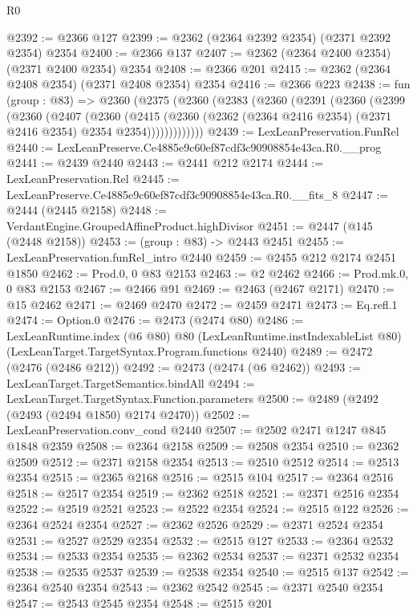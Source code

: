 \begin{lexlean}{R0}
\begin{coremodule}
@2392 := @2366 @127
@2399 := @2362 (@2364 @2392 @2354) (@2371 @2392 @2354) @2354
@2400 := @2366 @137
@2407 := @2362 (@2364 @2400 @2354) (@2371 @2400 @2354) @2354
@2408 := @2366 @201
@2415 := @2362 (@2364 @2408 @2354) (@2371 @2408 @2354) @2354
@2416 := @2366 @223
@2438 := fun (group : @83) =>
  @2360
    (@2375
      (@2360
        (@2383
          (@2360
            (@2391
              (@2360
                (@2399
                  (@2360
                    (@2407
                      (@2360
                        (@2415
                          (@2360
                            (@2362 (@2364 @2416 @2354) (@2371 @2416 @2354) @2354 @2354)))))))))))))
@2439 := LexLeanPreservation.FunRel
@2440 := LexLeanPreserve.Ce4885e9c60ef87cdf3c90908854e43ca.R0.__prog
@2441 := @2439 @2440
@2443 := @2441 @212 @2174
@2444 := LexLeanPreservation.Rel
@2445 := LexLeanPreserve.Ce4885e9c60ef87cdf3c90908854e43ca.R0.__fits_8
@2447 := @2444 (@2445 @2158)
@2448 := VerdantEngine.GroupedAffineProduct.highDivisor
@2451 := @2447 (@145 (@2448 @2158))
@2453 := (group : @83) -> @2443 @2451
@2455 := LexLeanPreservation.funRel_intro @2440
@2459 := @2455 @212 @2174 @2451 @1850
@2462 := Prod.{0, 0} @83 @2153
@2463 := @2 @2462
@2466 := Prod.mk.{0, 0} @83 @2153
@2467 := @2466 @91
@2469 := @2463 (@2467 @2171)
@2470 := @15 @2462
@2471 := @2469 @2470
@2472 := @2459 @2471
@2473 := Eq.refl.{1}
@2474 := Option.{0}
@2476 := @2473 (@2474 @80)
@2486 := LexLeanRuntime.index
    (@6 @80)
    @80
    (LexLeanRuntime.instIndexableList @80)
    (LexLeanTarget.TargetSyntax.Program.functions @2440)
@2489 := @2472 (@2476 (@2486 @212))
@2492 := @2473 (@2474 (@6 @2462))
@2493 := LexLeanTarget.TargetSemantics.bindAll
@2494 := LexLeanTarget.TargetSyntax.Function.parameters
@2500 := @2489 (@2492 (@2493 (@2494 @1850) @2174 @2470))
@2502 := LexLeanPreservation.conv_cond @2440
@2507 := @2502 @2471 @1247 @845 @1848 @2359
@2508 := @2364 @2158
@2509 := @2508 @2354
@2510 := @2362 @2509
@2512 := @2371 @2158 @2354
@2513 := @2510 @2512
@2514 := @2513 @2354
@2515 := @2365 @2168
@2516 := @2515 @104
@2517 := @2364 @2516
@2518 := @2517 @2354
@2519 := @2362 @2518
@2521 := @2371 @2516 @2354
@2522 := @2519 @2521
@2523 := @2522 @2354
@2524 := @2515 @122
@2526 := @2364 @2524 @2354
@2527 := @2362 @2526
@2529 := @2371 @2524 @2354
@2531 := @2527 @2529 @2354
@2532 := @2515 @127
@2533 := @2364 @2532
@2534 := @2533 @2354
@2535 := @2362 @2534
@2537 := @2371 @2532 @2354
@2538 := @2535 @2537
@2539 := @2538 @2354
@2540 := @2515 @137
@2542 := @2364 @2540 @2354
@2543 := @2362 @2542
@2545 := @2371 @2540 @2354
@2547 := @2543 @2545 @2354
@2548 := @2515 @201

\end{coremodule}
\end{lexlean}
